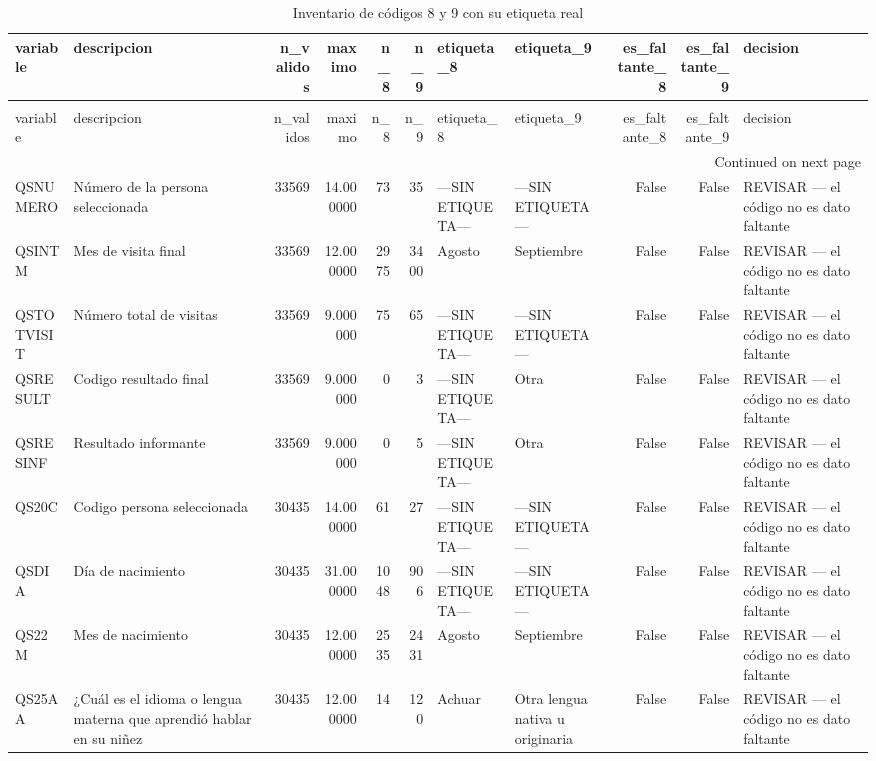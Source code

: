 \begin{longtable}{llrrrrllrrl}
\caption{Inventario de códigos 8 y 9 con su etiqueta real} \label{tab:tabla_03_inventario_codigos_8_9} \\
\toprule
variable & descripcion & n\_validos & maximo & n\_8 & n\_9 & etiqueta\_8 & etiqueta\_9 & es\_faltante\_8 & es\_faltante\_9 & decision \\
\midrule
\endfirsthead
\caption[]{Inventario de códigos 8 y 9 con su etiqueta real} \\
\toprule
variable & descripcion & n\_validos & maximo & n\_8 & n\_9 & etiqueta\_8 & etiqueta\_9 & es\_faltante\_8 & es\_faltante\_9 & decision \\
\midrule
\endhead
\midrule
\multicolumn{11}{r}{Continued on next page} \\
\midrule
\endfoot
\bottomrule
\endlastfoot
QSNUMERO & Número de la persona seleccionada & 33569 & 14.000000 & 73 & 35 & —SIN ETIQUETA— & —SIN ETIQUETA— & False & False & REVISAR — el código no es dato faltante \\
QSINTM & Mes de visita final & 33569 & 12.000000 & 2975 & 3400 & Agosto & Septiembre & False & False & REVISAR — el código no es dato faltante \\
QSTOTVISIT & Número total de visitas & 33569 & 9.000000 & 75 & 65 & —SIN ETIQUETA— & —SIN ETIQUETA— & False & False & REVISAR — el código no es dato faltante \\
QSRESULT & Codigo resultado final & 33569 & 9.000000 & 0 & 3 & —SIN ETIQUETA— & Otra & False & False & REVISAR — el código no es dato faltante \\
QSRESINF & Resultado informante & 33569 & 9.000000 & 0 & 5 & —SIN ETIQUETA— & Otra & False & False & REVISAR — el código no es dato faltante \\
QS20C & Codigo persona seleccionada & 30435 & 14.000000 & 61 & 27 & —SIN ETIQUETA— & —SIN ETIQUETA— & False & False & REVISAR — el código no es dato faltante \\
QSDIA & Día de nacimiento & 30435 & 31.000000 & 1048 & 906 & —SIN ETIQUETA— & —SIN ETIQUETA— & False & False & REVISAR — el código no es dato faltante \\
QS22M & Mes de nacimiento & 30435 & 12.000000 & 2535 & 2431 & Agosto & Septiembre & False & False & REVISAR — el código no es dato faltante \\
QS25AA & ¿Cuál es el idioma o lengua materna que aprendió hablar en su niñez & 30435 & 12.000000 & 14 & 120 & Achuar & Otra lengua nativa u originaria & False & False & REVISAR — el código no es dato faltante \\

\end{longtable}
